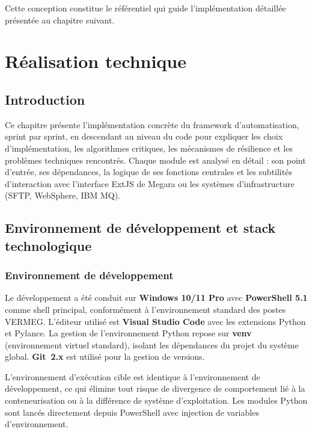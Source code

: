 \documentclass[12pt, a4paper]{report}
\begin{document}
Cette conception constitue le référentiel qui guide l'implémentation détaillée présentée au chapitre suivant.

\chapter{Réalisation technique}

\section*{Introduction}

Ce chapitre présente l'implémentation concrète du framework d'automatisation, sprint par sprint, en descendant au niveau du code pour expliquer les choix d'implémentation, les algorithmes critiques, les mécanismes de résilience et les problèmes techniques rencontrés. Chaque module est analysé en détail : son point d'entrée, ses dépendances, la logique de ses fonctions centrales et les subtilités d'interaction avec l'interface ExtJS de Megara ou les systèmes d'infrastructure (SFTP, WebSphere, IBM MQ).

\section{Environnement de développement et stack technologique}

\subsection{Environnement de développement}

Le développement a été conduit sur \textbf{Windows 10/11 Pro} avec \textbf{PowerShell 5.1} comme shell principal, conformément à l'environnement standard des postes VERMEG. L'éditeur utilisé est \textbf{Visual Studio Code} avec les extensions Python et Pylance. La gestion de l'environnement Python repose sur \textbf{venv} (environnement virtuel standard), isolant les dépendances du projet du système global. \textbf{Git~2.x} est utilisé pour la gestion de versions.

L'environnement d'exécution cible est identique à l'environnement de développement, ce qui élimine tout risque de divergence de comportement lié à la conteneurisation ou à la différence de système d'exploitation. Les modules Python sont lancés directement depuis PowerShell avec injection de variables d'environnement.
\end{document}
